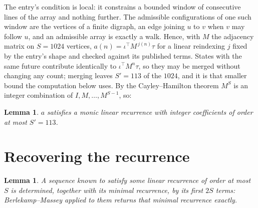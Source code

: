 \documentclass[11pt,a4paper]{article}
\theoremstyle{plain}
\newtheorem{lemma}[theorem]{Lemma}
\theoremstyle{definition}
\begin{document}
The entry's condition is local: it constrains a bounded window of consecutive lines of the
array and nothing further. The admissible configurations of one such window are the vertices
of a finite digraph, an edge joining $u$ to $v$ when $v$ may follow $u$, and an admissible
array is exactly a walk. Hence, with $M$ the adjacency matrix on $S=1024$ vertices,
$a(n)=\iota^{\!\top}M^{\,j(n)}\tau$ for a linear reindexing $j$ fixed by the entry's shape
and checked against its published terms. States with the same future contribute identically to $\iota^{\!\top}M^n\tau$, so they may be merged without changing any count; merging leaves $S'=113$ of the $1024$, and it is that smaller bound the computation below uses. By the Cayley--Hamilton theorem $M^{S}$ is an
integer combination of $I,M,\dots,M^{S-1}$, so:

\begin{lemma}\label{lem:cf}
$a$ satisfies a monic linear recurrence with integer coefficients of order at most
$S'=113$.
\end{lemma}

\section{Recovering the recurrence}

\begin{lemma}\label{lem:bm}
A sequence known to satisfy some linear recurrence of order at most $S$ is determined, together
with its minimal recurrence, by its first $2S$ terms: Berlekamp--Massey applied to them returns
that minimal recurrence exactly.
\end{lemma}
\end{document}
